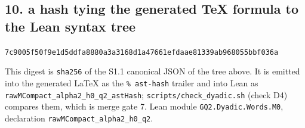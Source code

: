 \subsection{10. a hash tying the generated TeX formula to the Lean syntax tree}
\begin{center}\texttt{7c9005f50f9e1d5ddfa8880a3a3168d1a47661efdaae81339ab968055bbf036a}\end{center}
This digest is \texttt{sha256} of the S1.1 canonical JSON of the tree above.  It is emitted into the generated \LaTeX{} as the \texttt{\% ast-hash} trailer and into Lean as \texttt{rawMCompact\_alpha2\_h0\_q2\_astHash}; \texttt{scripts/check\_dyadic.sh} (check D4) compares them, which is merge gate 7.
Lean module \texttt{GQ2.Dyadic.Words.M0}, declaration \texttt{rawMCompact\_alpha2\_h0\_q2}.


